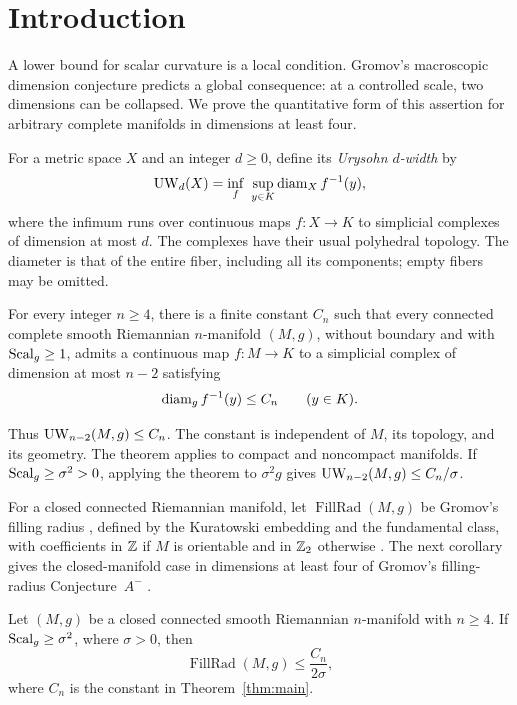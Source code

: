 \section{Introduction}\label{sec:introduction}

A lower bound for scalar curvature is a local condition. Gromov's
macroscopic dimension conjecture predicts a global consequence: at a
controlled scale, two dimensions can be collapsed. We prove the
quantitative form of this assertion for arbitrary complete manifolds
in dimensions at least four.

For a metric space \(X\) and an integer \(d\ge0\), define its
\emph{Urysohn \(d\)-width} by
\[
 \operatorname{UW}_d(X)=\inf_f\ \sup_{y\in K}\operatorname{diam}_X f^{-1}(y),
\]
where the infimum runs over continuous maps \(f:X\to K\) to simplicial
complexes of dimension at most \(d\). The complexes have their usual
polyhedral topology. The diameter is that of the entire fiber, including
all its components; empty fibers may be omitted.

\begin{theorem}\label{thm:main}
For every integer \(n\ge4\), there is a finite constant \(C_n\) such
that every connected complete smooth Riemannian \(n\)-manifold
\((M,g)\), without boundary and with \(\operatorname{Scal}_g\ge1\), admits a
continuous map \(f:M\to K\) to a simplicial complex of dimension at
most \(n-2\) satisfying
\[
 \operatorname{diam}_g f^{-1}(y)\le C_n\qquad(y\in K).
\]

\end{theorem}

Thus \(\operatorname{UW}_{n-2}(M,g)\le C_n\). The constant is independent of \(M\), its topology, and its geometry.
The theorem applies to compact and noncompact manifolds. If
\(\operatorname{Scal}_g\ge\sigma^2>0\), applying the theorem to \(\sigma^2g\) gives
\(\operatorname{UW}_{n-2}(M,g)\le C_n/\sigma\).

For a closed connected Riemannian manifold, let
\(\operatorname{FillRad}(M,g)\) be Gromov's filling radius
\citep{gromov1983Filling}, defined by the Kuratowski embedding and the
fundamental class, with coefficients in
\(\mathbb Z\) if \(M\) is orientable and in \(\mathbb Z_2\) otherwise
\citep[Definition~3.1]{nabutovskyRotmanSabourau2021}.
The next corollary gives the closed-manifold case in dimensions at least
four of Gromov's filling-radius Conjecture~\(A^{-}\)
\citep[\S3]{gromov2017Dozen}.

\begin{corollary}
\label{cor:filling-radius}
Let \((M,g)\) be a closed connected smooth Riemannian \(n\)-manifold
with \(n\ge4\). If \(\operatorname{Scal}_g\ge\sigma^2\), where \(\sigma>0\), then
\[
 \operatorname{FillRad}(M,g)\le \frac{C_n}{2\sigma},
\]
where \(C_n\) is the constant in Theorem~\ref{thm:main}.
\end{corollary}



